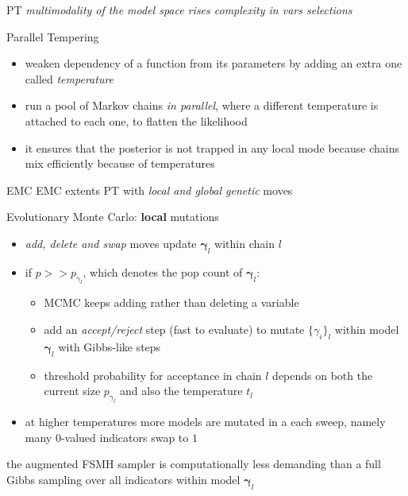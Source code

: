 \documentclass{beamer}
\newcommand{\vect}[1]{\boldsymbol{#1}}
\begin{document}
\begin{frame}{PT}
\emph{multimodality of the model space rises complexity in vars selections}
\begin{block}{Parallel Tempering}
    \begin{itemize}
        \item weaken dependency of a function from its parameters by adding an
        extra one called \emph{temperature}
        \item run a pool of Markov chains \emph{in parallel}, where a different
        temperature is attached to each one, to flatten the likelihood
        \item it ensures that the posterior is not trapped in any local mode because 
        chains mix efficiently because of temperatures
    \end{itemize}
\end{block}
\end{frame}

\begin{frame}{EMC}
EMC extents PT with \emph{local and global genetic} moves
\begin{block}{Evolutionary Monte Carlo: \textbf{local} mutations}
    \begin{itemize}
        \item \emph{add, delete and swap}  moves update
        $\vect{\gamma}_{l}$ within chain $l$
        \item if $p >> p_{\gamma_{l}}$, which denotes the pop count of $\vect{\gamma}_{l}$:
            \begin{itemize}
                \item MCMC keeps adding rather than deleting a variable
                \item add an \emph{accept/reject} step (fast to evaluate) to
                mutate $ \lbrace \gamma_{i} \rbrace_{l}$ within model
                $\vect{\gamma}_{l}$ with Gibbs-like steps
                \item threshold probability for acceptance in chain $l$ depends on both the 
                current size $p_{\gamma_{l}}$ and also the temperature $t_{l}$
            \end{itemize}
        \item at higher temperatures more models are mutated in a each sweep,
        namely many $0$-valued indicators swap to $1$
    \end{itemize}
    the augmented FSMH sampler is computationally less demanding than a full Gibbs sampling 
    over all indicators within model $\vect{\gamma}_{l}$
    \end{block}
\end{frame}
\end{document}
